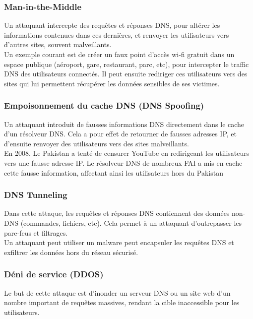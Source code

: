 \documentclass[12pt,a4paper]{article}
\begin{document}
		
		\subsubsection{Man-in-the-Middle}	
		
		Un attaquant intercepte des requêtes et réponses DNS, pour altérer les informations contenues dans ces dernières, et renvoyer les utilisateurs vers d'autres sites, souvent malveillants. \\
		
		Un exemple courant est de créer un faux point d'accès wi-fi gratuit dans un espace publique (aéroport, gare, restaurant, parc, etc), pour intercepter le traffic DNS des utilisateurs connectés. Il peut ensuite rediriger ces utilisateurs vers des sites qui lui permettent récupérer les données sensibles de ses victimes.
		
		\subsubsection{Empoisonnement du cache DNS (DNS Spoofing)}	
		
		Un attaquant introduit de fausses informations DNS directement dans le cache d'un résolveur DNS. Cela a pour effet de retourner de fausses adresses IP, et d'ensuite renvoyer des utilisateurs vers des sites malveillants.\\
		
		En 2008, Le Pakistan a tenté de censurer YouTube en redirigeant les utilisateurs vers une fausse adresse IP. Le résolveur DNS de nombreux FAI a mis en cache cette fausse information, affectant ainsi les utilisateurs hors du Pakistan
	
		\subsubsection{DNS Tunneling}	
		
		Dans cette attaque, les requêtes et réponses DNS contiennent des données non-DNS (commandes, fichiers, etc). Cela permet à un attaquant d'outrepasser les pare-feus et filtrages.\\
		
		Un attaquant peut utiliser un malware peut encapsuler les requêtes DNS et exfiltrer les données hors du réseau sécurisé.
		\subsubsection{Déni de service (DDOS)}	
		
		Le but de cette attaque est d'inonder un serveur DNS ou un site web d'un nombre important de requêtes massives, rendant la cible inaccessible pour les utilisateurs.\\
		
\end{document}
